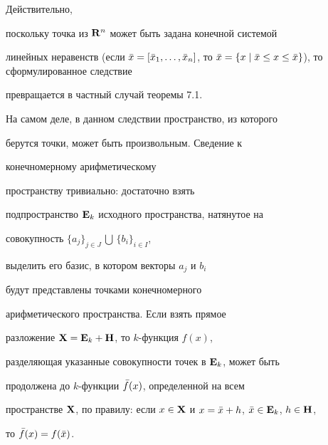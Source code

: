Действительно,


поскольку точка из $\bold R^n$ может быть задана конечной системой


линейных неравенств (если $\Bar x = [


\nk{\Bar{x}_1}{\Bar{x}_n}]$, то $\Bar x = \{ x \mid


\Bar x \le x \le \Bar x \}$), то сформулированное следствие


превращается в частный случай теоремы 7.1.


На самом деле, в данном следствии пространство, из которого


берутся точки, может быть произвольным. Сведение к


конечномерному арифметическому


пространству тривиально: достаточно взять


подпространство $\bold E_{k}$ исходного пространства, натянутое на


совокупность $\{a_j\}_{j \in J} \,\bigcup\, \{b_i\}_{i \in I}$,


выделить его базис, в котором векторы $a_j$ и $b_i$


будут представлены точками конечномерного


арифметического пространства. Если взять прямое


разложение $\bold X=\bold E_{k}+\bold H$, то $k$-функция $f(x)$,


разделяющая указанные совокупности точек в $\bold E_{k}$, может быть


продолжена до $k$-функции $\Bar{f}(x)$, определенной на всем


пространстве $\bold X$, по правилу: если $x \in\bold X$ и $x


= \Bar{x} + h$, $\Bar{x} \in\En{k}$, $h \in\bold H$,


то $\Bar{f}(x) =f(\Bar{x})$.









